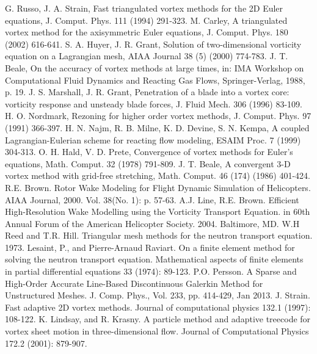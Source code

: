 \documentclass[letterpaper,12pt]{report}
\begin{document}
\begin{thebibliography}{9}
G. Russo, J. A. Strain, Fast triangulated vortex methods for the 2D Euler equations, J. Comput. Phys. 111 (1994) 291-323.
M. Carley, A triangulated vortex method for the axisymmetric Euler equations, J. Comput. Phys. 180 (2002) 616-641.
S. A. Huyer, J. R. Grant, Solution of two-dimensional vorticity equation on a Lagrangian mesh, AIAA Journal 38 (5) (2000) 774-783.
J. T. Beale, On the accuracy of vortex methods at large times, in: IMA Workshop on Computational Fluid Dynamics and Reacting Gas Flows, Springer-Verlag, 1988, p. 19.
J. S. Marshall, J. R. Grant, Penetration of a blade into a vortex core: vorticity response and unsteady blade forces, J. Fluid Mech. 306 (1996) 83-109.
H. O. Nordmark, Rezoning for higher order vortex methods, J. Comput. Phys. 97 (1991) 366-397.
H. N. Najm, R. B. Milne, K. D. Devine, S. N. Kempa, A coupled Lagrangian-Eulerian scheme for reacting flow modeling, ESAIM Proc. 7 (1999) 304-313.
O. H. Hald, V. D. Prete, Convergence of vortex methods for Euler's equations, Math. Comput. 32 (1978) 791-809.
J. T. Beale, A convergent 3-D vortex method with grid-free stretching, Math. Comput. 46 (174) (1986) 401-424.
 R.E. Brown. Rotor Wake Modeling for Flight Dynamic Simulation of Helicopters. AIAA Journal, 2000. Vol. 38(No. 1): p. 57-63.
A.J. Line, R.E. Brown. Efficient High-Resolution Wake Modelling using the Vorticity Transport Equation. in 60th Annual Forum of the American Helicopter Society. 2004. Baltimore, MD.
W.H Reed and T.R. Hill. Triangular mesh methods for the neutron transport equation. 1973.
Lesaint, P., and Pierre-Arnaud Raviart. On a finite element method for solving the neutron transport equation. Mathematical aspects of finite elements in partial differential equations 33 (1974): 89-123.
P.O. Persson. A Sparse and High-Order Accurate Line-Based Discontinuous Galerkin Method for Unstructured Meshes. J. Comp. Phys., Vol. 233, pp. 414-429, Jan 2013.
J. Strain. Fast adaptive 2D vortex methods. Journal of computational physics 132.1 (1997): 108-122.
K. Lindsay, and R. Krasny. A particle method and adaptive treecode for vortex sheet motion in three-dimensional flow. Journal of Computational Physics 172.2 (2001): 879-907.

\end{thebibliography}
\end{document}
